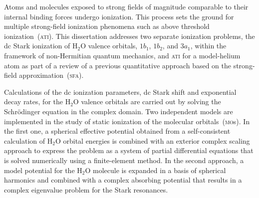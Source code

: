 





Atoms and molecules exposed to strong fields of magnitude comparable
to their internal binding forces undergo ionization. This process sets
the ground for multiple strong-field ionization phenomena such as
above threshold ionization~(\textsc{ati}).
This dissertation addresses two separate ionization problems, the dc
Stark ionization of H$_{2}$O valence orbitals, $1b_{1}$, $1b_{2}$, and
$3a_{1}$, within the framework of non-Hermitian quantum mechanics, and
\textsc{ati} for a model-helium atom as part of a review of a previous
quantitative approach based on the strong-field
approximation~(\textsc{sfa}).


Calculations of the dc ionization parameters, dc Stark shift and
exponential decay rates, for the H$_{2}$O valence orbitals are carried
out by solving the Schr\"{o}dinger equation in the complex domain. Two
independent models are implemented in the study of static ionization
of the molecular orbitals~(\textsc{mo}s). In the first one, a
spherical effective potential obtained from a self-consistent
calculation of H$_{2}$O orbital energies is combined with an exterior
complex scaling approach to express the problem as a system of partial
differential equations that is solved numerically using a
finite-element method. In the second approach, a model potential for
the H$_{2}$O molecule is expanded in a basis of spherical harmonics
and combined with a complex absorbing potential that results in a
complex eigenvalue problem for the Stark resonances.

